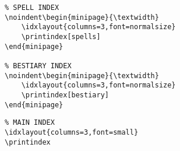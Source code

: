 \documentclass[itdr]{subfiles}
\begin{document}
\clearpage

\noindent\begin{minipage}{\textwidth}
\printindex[spells]
\end{minipage}

\noindent\begin{minipage}{\textwidth}
\printindex[bestiary]
\end{minipage}

\vfill

\faHandPointUp

\vspace{1ex}

\noindent\begin{minipage}{\textwidth}
\begin{lstlisting}
% SPELL INDEX
\noindent\begin{minipage}{\textwidth}
	\idxlayout{columns=3,font=normalsize}
	\printindex[spells]
\end{minipage}

% BESTIARY INDEX
\noindent\begin{minipage}{\textwidth}
	\idxlayout{columns=3,font=normalsize}
	\printindex[bestiary]
\end{minipage}
\end{lstlisting}
\end{minipage}

\clearpage

{\let\clearpage\relax
\printindex}

\vfill

\faHandPointUp

\vspace{1ex}

\noindent\begin{minipage}{\textwidth}
\begin{lstlisting}
% MAIN INDEX
\idxlayout{columns=3,font=small}
\printindex
\end{lstlisting}
\end{minipage}
\end{document}
